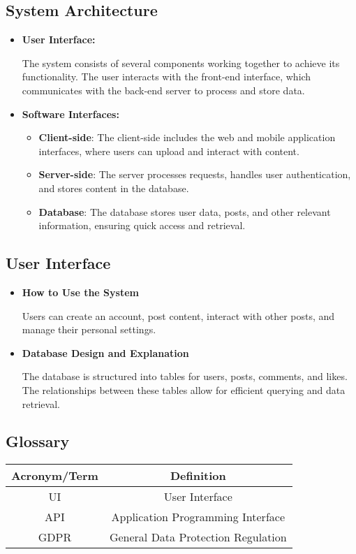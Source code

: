 \documentclass{article}
\begin{document}
\subsection{System Architecture}
\begin{itemize}
    \item \textbf{User Interface:}

            The system consists of several components working together to achieve its functionality. The user interacts with the front-end interface, which communicates with the back-end server to process and store data. 

    \item \textbf{Software Interfaces:}
        \begin{itemize}
            \item \textbf{Client-side}: The client-side includes the web and mobile application interfaces, where users can upload and interact with content.
            \item \textbf{Server-side}: The server processes requests, handles user authentication, and stores content in the database.
            \item \textbf{Database}: The database stores user data, posts, and other relevant information, ensuring quick access and retrieval.
        \end{itemize}

\end{itemize}

\subsection{User Interface}
\begin{itemize}
    \item \textbf{How to Use the System}
        
            Users can create an account, post content, interact with other posts, and manage their personal settings.
        
    \item \textbf{Database Design and Explanation}
        
            The database is structured into tables for users, posts, comments, and likes. The relationships between these tables allow for efficient querying and data retrieval.
        
\end{itemize}

\subsection{Glossary}
\begin{tabular}{|c|c|}
    \hline
    \textbf{Acronym/Term} & \textbf{Definition} \\
    \hline
    UI & User Interface \\
    API & Application Programming Interface \\
    GDPR & General Data Protection Regulation \\
    \hline
\end{tabular}
    
\end{document}
